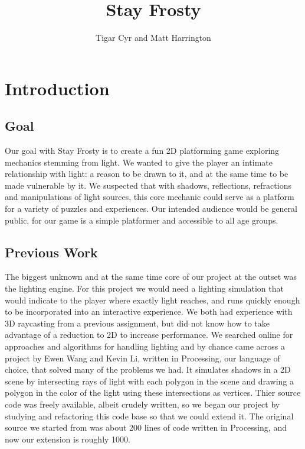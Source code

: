 \documentclass[11pt]{article} %
\title{Stay Frosty}
\author{Tigar Cyr and Matt Harrington}
\begin{document}
\maketitle

\section{Introduction}

\subsection{Goal}

Our goal with Stay Frosty is to create a fun 2D platforming game exploring mechanics stemming from light.  We wanted to give the player an intimate relationship with light: a reason to be drawn to it, and at the same time to be made vulnerable by it.  We suspected that with shadows, reflections, refractions and manipulations of light sources, this core mechanic could serve as a platform for a variety of puzzles and experiences.  Our intended audience would be general public, for our game is a simple platformer and accessible to all age groups. \par

\subsection{Previous Work}
The biggest unknown and at the same time core of our project at the outset was the lighting engine.  For this project we would need a lighting simulation that would indicate to the player where exactly light reaches, and runs quickly enough to be incorporated into an interactive experience.  We both had experience with 3D raycasting from a previous assignment, but did not know how to take advantage of a reduction to 2D to increase performance.  We searched online for approaches and algorithms for handling lighting and by chance came across a project by Ewen Wang and Kevin Li, written in Processing, our language of choice, that solved many of the problems we had.  It simulates shadows in a 2D scene by intersecting rays of light with each polygon in the scene and drawing a polygon in the color of the light using these intersections as vertices.  Thier source code was freely available, albeit crudely written, so we began our project by studying and refactoring this code base so that we could extend it.  The original source we started from was about 200 lines of code written in Processing, and now our extension is roughly 1000.
\end{document}
